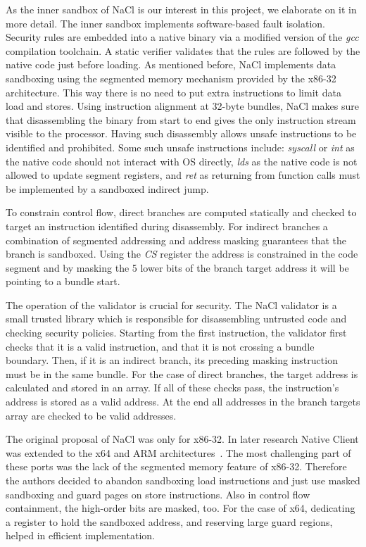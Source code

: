 \documentclass[conference]{IEEEtran}
\begin{document}
As the inner sandbox of NaCl is  our interest in this project, we elaborate on it in more detail. The inner sandbox implements software-based fault isolation. Security rules are embedded  into a native binary via a modified version of the \textit{gcc} compilation toolchain. A static verifier validates that the rules are followed by the native code just before loading. As mentioned before, NaCl implements data sandboxing using the segmented memory mechanism provided by the x86-32 architecture. This way there is no need to put extra instructions to limit data load and stores. Using instruction alignment  at 32-byte bundles, NaCl makes sure that disassembling  the binary from start to end gives the only instruction  stream visible to the processor. Having such disassembly  allows unsafe instructions to be identified and prohibited. Some  such unsafe instructions include: \textit{syscall} or \textit{int} as the native code should not interact with OS directly, \textit{lds} as the native code is not allowed to update segment registers, and \textit{ret} as returning from function calls must be implemented by a sandboxed indirect jump. 

To constrain control flow, direct branches are computed statically and checked to target an instruction identified during disassembly. For indirect branches a combination of segmented addressing and address masking guarantees that the branch is sandboxed. Using the \textit{CS} register the address is constrained in the code segment and by masking the 5 lower bits of the branch target address it will be pointing to a bundle start. 

The operation of the validator is crucial for security. The NaCl validator is a small trusted library which is responsible for disassembling untrusted code and checking security policies. Starting from the first instruction, the validator first checks that it is a valid instruction, and that it is not crossing a bundle boundary. Then, if it is an indirect  branch, its preceding masking instruction must be in the same bundle. For the case of direct branches, the target address is calculated and stored in an array. If all of these checks pass, the instruction's address is stored as a valid address. At the end all addresses in the branch targets array are checked to be valid addresses.

The original proposal of NaCl was only for x86-32. In later research Native Client was extended to the x64 and ARM architectures~\cite{sehrNaclx64}. The most challenging part of these ports was the lack of the segmented memory feature of x86-32. Therefore the authors decided to abandon sandboxing load instructions and just use masked sandboxing  and guard pages on store instructions. Also in control flow containment, the high-order bits are masked, too. For the case of x64, dedicating a register to hold the  sandboxed address, and reserving large guard regions, helped in efficient implementation.
\end{document}
